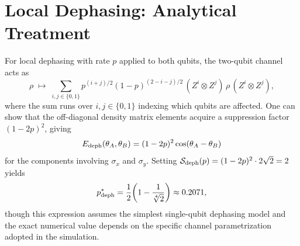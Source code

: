 \documentclass[12pt]{article}
\newcommand{\pstar}{p^*}
\newcommand{\bigS}{\mathcal{S}}
\begin{document}
\section{Local Dephasing: Analytical Treatment}
\label{app:dephasing}

For local dephasing with rate $p$ applied to both qubits, the two-qubit channel acts as
\begin{equation}
  \rho \;\mapsto\; \sum_{i,j \in \{0,1\}} p^{(i+j)/2}(1-p)^{(2-i-j)/2}\,(Z^i\otimes Z^j)\,\rho\,(Z^i\otimes Z^j),
  \label{eq:dephase_twoqubit}
\end{equation}
where the sum runs over $i,j \in \{0,1\}$ indexing which qubits are affected.
One can show that the off-diagonal density matrix elements acquire a suppression factor $(1-2p)^2$,
giving
\begin{equation}
  E_{\rm deph}(\theta_A,\theta_B) = (1-2p)^2\cos(\theta_A - \theta_B)
  \label{eq:e_dephased}
\end{equation}
for the components involving $\sigma_x$ and $\sigma_y$.
Setting $\bigS_{\rm deph}(p) = (1-2p)^2\cdot 2\sqrt{2} = 2$ yields
\begin{equation}
  \pstar_{\rm deph} = \frac{1}{2}\!\left(1 - \frac{1}{\sqrt[4]{2}}\right) \approx 0.2071,
  \label{eq:pstar_deph}
\end{equation}
though this expression assumes the simplest single-qubit dephasing model and the exact numerical
value depends on the specific channel parametrization adopted in the simulation.
\end{document}
